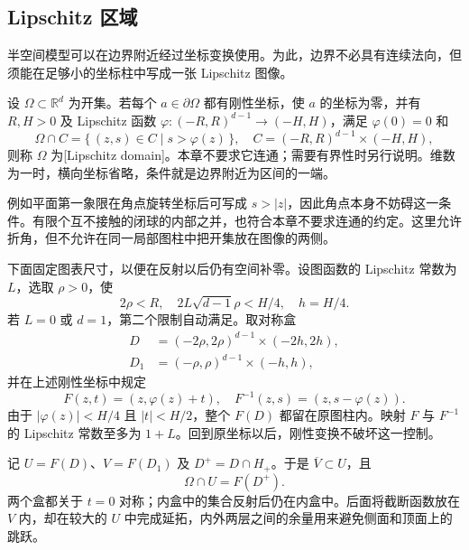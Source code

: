 \subsection{Lipschitz 区域}
\label{b1:subsec:220302}

半空间模型可以在边界附近经过坐标变换使用。为此，边界不必具有连续法向，但须能在足够小的坐标柱中写成一张 Lipschitz 图像。

\begin{definition}\label{b1:def:lipschitz-domain}
设 \(\Omega\subset\mathbb R^d\) 为开集。若每个 \(a\in\partial\Omega\) 都有刚性坐标，使 \(a\) 的坐标为零，并有 \(R,H>0\) 及 Lipschitz 函数
\(\varphi:(-R,R)^{d-1}\rightarrow(-H,H)\)，满足 \(\varphi(0)=0\) 和
\[
 \Omega\cap C=\{\,(z,s)\in C\mid s>\varphi(z)\,\},
 \quad C=(-R,R)^{d-1}\times(-H,H),
\]
则称 \(\Omega\) 为[Lipschitz domain]。本章不要求它连通；需要有界性时另行说明。维数为一时，横向坐标省略，条件就是边界附近为区间的一端。
\end{definition}

例如平面第一象限在角点旋转坐标后可写成 \(s>|z|\)，因此角点本身不妨碍这一条件。有限个互不接触的闭球的内部之并，也符合本章不要求连通的约定。这里允许折角，但不允许在同一局部图柱中把开集放在图像的两侧。

\ProseParagraphBreak

下面固定图表尺寸，以便在反射以后仍有空间补零。设图函数的 Lipschitz 常数为 \(L\)，选取 \(\rho>0\)，使
\[
 2\rho<R,\quad 2L\sqrt{d-1}\rho<H/4,
 \quad h=H/4.
\]
若 \(L=0\) 或 \(d=1\)，第二个限制自动满足。取对称盒
\[
 \begin{split}
 D&=(-2\rho,2\rho)^{d-1}\times(-2h,2h),\\
 D_1&=(-\rho,\rho)^{d-1}\times(-h,h),
 \end{split}
\]
并在上述刚性坐标中规定
\[
 F(z,t)=(z,\varphi(z)+t),\quad
 F^{-1}(z,s)=(z,s-\varphi(z)).
\]
由于 \(|\varphi(z)|<H/4\) 且 \(|t|<H/2\)，整个 \(F(D)\) 都留在原图柱内。映射 \(F\) 与 \(F^{-1}\) 的 Lipschitz 常数至多为 \(1+L\)。回到原坐标以后，刚性变换不破坏这一控制。

\ProseParagraphBreak

记 \(U=F(D)\)、\(V=F(D_1)\) 及 \(D^+=D\cap H_+\)。于是 \(\overline V\subset U\)，且
\[
 \Omega\cap U=F(D^+).
\]
两个盒都关于 \(t=0\) 对称；内盒中的集合反射后仍在内盒中。后面将截断函数放在 \(V\) 内，却在较大的 \(U\) 中完成延拓，内外两层之间的余量用来避免侧面和顶面上的跳跃。

